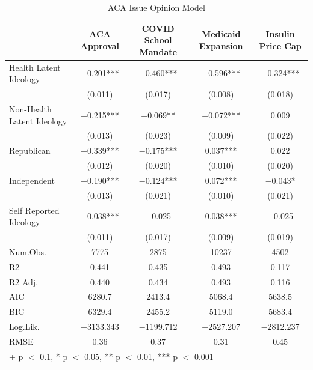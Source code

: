 \documentclass[
  oneside]{book}
\begin{document}
\begin{table}

\caption{\label{tab:acaopinion-model}ACA Issue Opinion Model}
\centering
\begin{tabular}[t]{lcccc}
\toprule
  & ACA Approval & COVID School Mandate & Medicaid Expansion & Insulin Price Cap\\
\midrule
Health Latent Ideology & \num{-0.201}*** & \num{-0.460}*** & \num{-0.596}*** & \num{-0.324}***\\
 & (\num{0.011}) & (\num{0.017}) & (\num{0.008}) & (\num{0.018})\\
Non-Health Latent Ideology & \num{-0.215}*** & \num{-0.069}** & \num{-0.072}*** & \num{0.009}\\
 & (\num{0.013}) & (\num{0.023}) & (\num{0.009}) & (\num{0.022})\\
Republican & \num{-0.339}*** & \num{-0.175}*** & \num{0.037}*** & \num{0.022}\\
 & (\num{0.012}) & (\num{0.020}) & (\num{0.010}) & (\num{0.020})\\
Independent & \num{-0.190}*** & \num{-0.124}*** & \num{0.072}*** & \num{-0.043}*\\
 & (\num{0.013}) & (\num{0.021}) & (\num{0.010}) & (\num{0.021})\\
Self Reported Ideology & \num{-0.038}*** & \num{-0.025} & \num{0.038}*** & \num{-0.025}\\
 & (\num{0.011}) & (\num{0.017}) & (\num{0.009}) & (\num{0.019})\\
\midrule
Num.Obs. & \num{7775} & \num{2875} & \num{10237} & \num{4502}\\
R2 & \num{0.441} & \num{0.435} & \num{0.493} & \num{0.117}\\
R2 Adj. & \num{0.440} & \num{0.434} & \num{0.493} & \num{0.116}\\
AIC & \num{6280.7} & \num{2413.4} & \num{5068.4} & \num{5638.5}\\
BIC & \num{6329.4} & \num{2455.2} & \num{5119.0} & \num{5683.4}\\
Log.Lik. & \num{-3133.343} & \num{-1199.712} & \num{-2527.207} & \num{-2812.237}\\
RMSE & \num{0.36} & \num{0.37} & \num{0.31} & \num{0.45}\\
\bottomrule
\multicolumn{5}{l}{\rule{0pt}{1em}+ p $<$ 0.1, * p $<$ 0.05, ** p $<$ 0.01, *** p $<$ 0.001}\\
\end{tabular}
\end{table}
\end{document}
